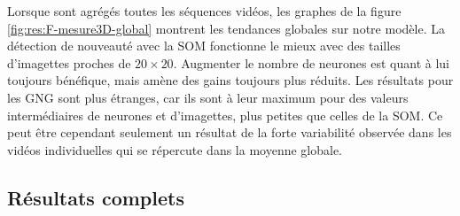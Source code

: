 	Lorsque sont agrégés toutes les séquences vidéos, les graphes de la figure \ref{fig:res:F-mesure3D-global} montrent les tendances globales sur notre modèle. La détection de nouveauté avec la SOM fonctionne le mieux avec des tailles d'imagettes proches de $20\times20$. Augmenter le nombre de neurones est quant à lui toujours bénéfique, mais amène des gains toujours plus réduits. Les résultats pour les GNG sont plus étranges, car ils sont à leur maximum pour des valeurs intermédiaires de neurones et d'imagettes, plus petites que celles de la SOM. Ce peut être cependant seulement un résultat de la forte variabilité observée dans les vidéos individuelles qui se répercute dans la moyenne globale.

	\subsection{Résultats complets}\label{sec:res:stats}

